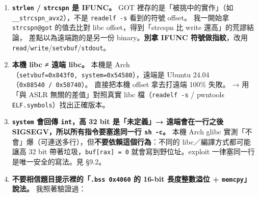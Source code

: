 \documentclass[10pt,a4paper]{article}
\begin{document}
\begin{enumerate}
  收到的指標指到\textbf{沒有映射的頁}，\texttt{strlen} 就會 SIGSEGV，
  \textgreater{} 整個連線當場死掉。拿它去亂掃記憶體是自殺 ------
  這也是為什麼 exploit 只讀固定的那幾個 \textgreater{} GOT／COPY
  位址（\texttt{0x404000}--\texttt{0x404068}）。
\item
  \textbf{\texttt{strlen} / \texttt{strcspn} 是 IFUNC。} GOT
  裡存的是「被挑中的實作」（如 \texttt{\_\allowbreak{}\_\allowbreak{}strcspn\_\allowbreak{}avx2}），不是
  \texttt{readelf\ \allowbreak{}-\allowbreak{}s} 看到的符號 offset。 我一開始拿
  \texttt{strcspn@got} 的值去比對 libc offset，得到「strcspn 比 write
  還高」的荒謬結論， 差點以為遠端跑的是另一份 binary。\textbf{別拿 IFUNC
  符號做指紋}，改用
  \texttt{read}/\texttt{write}/\texttt{setvbuf}/\texttt{stdout}。
\item
  \textbf{本機 libc ≠ 遠端 libc。} 本機是
  Arch（\texttt{setvbuf=0x843f0,\allowbreak{}\ \allowbreak{}system=0x54580}），遠端是 Ubuntu
  24.04（\texttt{0x88540\ \allowbreak{}/\allowbreak{}\ \allowbreak{}0x58740}）。 直接把本機 offset 拿去打遠端
  100\% 失敗。 → 用「與 ASLR 無關的差值」對照真實 libc
  檔（\texttt{readelf\ \allowbreak{}-\allowbreak{}s} / pwntools
  \texttt{ELF.\allowbreak{}symbols}）找出正確版本。
\item
  \textbf{\texttt{system} 會回傳 \texttt{int}，高 32 bit 是「未定義」→
  遠端會在一行之後 SIGSEGV，所以所有指令要塞進同一行 \texttt{sh\ \allowbreak{}-\allowbreak{}c}。}
  本機 Arch glibc
  實測「不會」爆（可連送多行），但\textbf{不要依賴這個行為}：不同的
  libc／編譯方式都可能讓高 32 bit 帶著垃圾，\texttt{buf{[}rax{]}\ \allowbreak{}=\ \allowbreak{}0}
  就會寫到野位址。exploit 一律塞同一行是唯一安全的寫法。見 §9.2。
\item
  \textbf{不要相信題目提示裡的「\texttt{.\allowbreak{}bss\ \allowbreak{}0x4060} 的 16-bit
  長度整數溢位 + \texttt{memcpy}」說法。} 我照著驗證過：


\end{enumerate}
\end{document}
